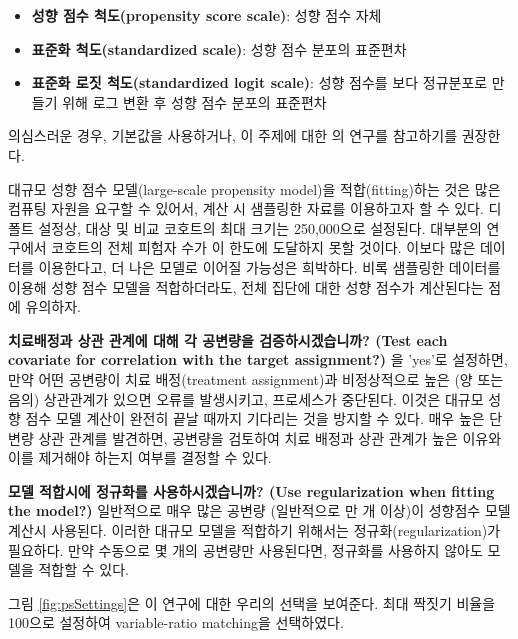 \documentclass[11pt]{book}
\providecommand{\tightlist}{%
  \setlength{\itemsep}{0pt}\setlength{\parskip}{0pt}}
\theoremstyle{definition}
\theoremstyle{definition}
\theoremstyle{definition}
\theoremstyle{remark}
\begin{document}
\begin{itemize}
\tightlist
\item
  \textbf{성향 점수 척도(propensity score scale)}: 성향 점수 자체
\item
  \textbf{표준화 척도(standardized scale)}: 성향 점수 분포의 표준편차
\item
  \textbf{표준화 로짓 척도(standardized logit scale)}: 성향 점수를 보다
  정규분포로 만들기 위해 로그 변환 후 성향 점수 분포의 표준편차
\end{itemize}

의심스러운 경우, 기본값을 사용하거나, 이 주제에 대한 \citet{austin_2011}
의 연구를 참고하기를 권장한다.

대규모 성향 점수 모델(large-scale propensity model)을 적합(fitting)하는
것은 많은 컴퓨팅 자원을 요구할 수 있어서, 계산 시 샘플링한 자료를
이용하고자 할 수 있다. 디폴트 설정상, 대상 및 비교 코호트의 최대 크기는
250,000으로 설정된다. 대부분의 연구에서 코호트의 전체 피험자 수가 이
한도에 도달하지 못할 것이다. 이보다 많은 데이터를 이용한다고, 더 나은
모델로 이어질 가능성은 희박하다. 비록 샘플링한 데이터를 이용해 성향 점수
모델을 적합하더라도, 전체 집단에 대한 성향 점수가 계산된다는 점에
유의하자.

\textbf{치료배정과 상관 관계에 대해 각 공변량을 검증하시겠습니까? (Test
each covariate for correlation with the target assignment?)} 을 'yes'로
설정하면, 만약 어떤 공변량이 치료 배정(treatment assignment)과
비정상적으로 높은 (양 또는 음의) 상관관계가 있으면 오류를 발생시키고,
프로세스가 중단된다. 이것은 대규모 성향 점수 모델 계산이 완전히 끝날
때까지 기다리는 것을 방지할 수 있다. 매우 높은 단변량 상관 관계를
발견하면, 공변량을 검토하여 치료 배정과 상관 관계가 높은 이유와 이를
제거해야 하는지 여부를 결정할 수 있다.

\textbf{모델 적합시에 정규화를 사용하시겠습니까? (Use regularization
when fitting the model?)} 일반적으로 매우 많은 공변량 (일반적으로 만 개
이상)이 성향점수 모델 계산시 사용된다. 이러한 대규모 모델을 적합하기
위해서는 정규화(regularization)가 필요하다. 만약 수동으로 몇 개의
공변량만 사용된다면, 정규화를 사용하지 않아도 모델을 적합할 수 있다.

그림 \ref{fig:psSettings}은 이 연구에 대한 우리의 선택을 보여준다. 최대
짝짓기 비율을 100으로 설정하여 variable-ratio matching을 선택하였다.
\end{document}
